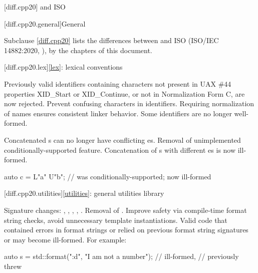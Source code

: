 
[diff.cpp20]{\Cpp{} and ISO \CppXX{}}

[diff.cpp20.general]{General}

\pnum
{}%
Subclause \ref{diff.cpp20} lists the differences between \Cpp{} and
ISO \CppXX{} (ISO/IEC 14882:2020, ),
by the chapters of this document.

[diff.cpp20.lex]{\ref{lex}: lexical conventions}

\change
Previously valid identifiers containing characters
not present in UAX \#44 properties XID_Start or XID_Continue, or
not in Normalization Form C, are now rejected.
\rationale
Prevent confusing characters in identifiers.
Requiring normalization of names ensures consistent linker behavior.
\effect
Some identifiers are no longer well-formed.

\change
Concatenated s can no longer have
conflicting es.
\rationale
Removal of unimplemented conditionally-supported feature.
\effect
Concatenation of s
with different es
is now ill-formed.
\begin{example}
\begin{codeblock}
auto c = L"a" U"b";             // was conditionally-supported; now ill-formed
\end{codeblock}
\end{example}

[diff.cpp20.utilities]{\ref{utilities}: general utilities library}

\change
Signature changes: , , ,
, .
Removal of .
\rationale
Improve safety via compile-time format string checks,
avoid unnecessary template instantiations.
\effect
Valid \CppXX{} code that
contained errors in format strings or
relied on previous format string signatures or
 may become ill-formed.
For example:
\begin{codeblock}
auto s = std::format("{:d}", "I am not a number");      // ill-formed,
                                                        // previously threw 
\end{codeblock}

